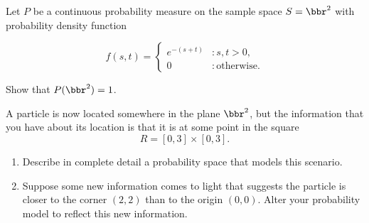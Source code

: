 \documentclass[12pt,reqno]{amsart}
\begin{document}
\prob Let $P$ be a continuous probability measure on the sample space $S=\bbr^2$ with probability density function

\[f(s,t) = \begin{cases}
e^{-(s+t)} & : s,t >0, \\
0 & : \text{otherwise}.    
\end{cases}\]

Show that $P(\bbr^2)=1$.\vfill

















\newpage
\prob A particle is now located somewhere in the plane $\bbr^2$, but the  information that you have about its location is that it is at some point in the square
    \[R = [0,3] \times [0,3].\]

\medskip
\begin{enumerate}
    \item Describe in complete detail a probability space that models this scenario.\vfill

   

    \item Suppose some new information comes to light that suggests the particle is closer to the corner $(2,2)$ than to the origin $(0,0)$. Alter your probability model to reflect this new information.
    \end{enumerate}
    
   \vfill
\end{document}
